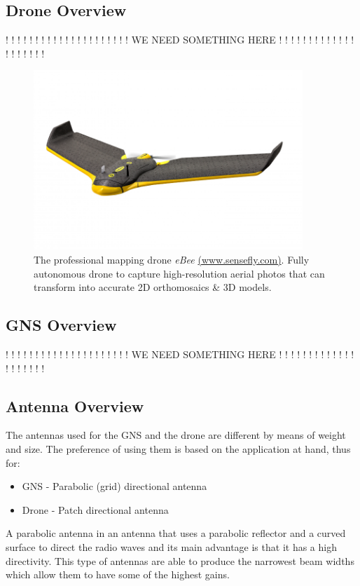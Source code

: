 \subsection{Drone Overview}
			! !	! ! ! ! ! ! ! ! ! ! ! !
! ! ! ! ! ! ! WE NEED SOMETHING HERE ! ! ! ! ! !
			! ! ! ! ! ! ! ! ! ! ! ! ! !

\begin{figure}[hb]
  \centering
  \includegraphics[width=4in]{figures/eBee.png}
  \caption[The professional mapping drone eBee]
   {The professional mapping drone \textit{eBee} \href{https://www.sensefly.com/drones/ebee.html}{(www.sensefly.com)}. Fully autonomous drone to capture high-resolution aerial photos that can transform into accurate 2D orthomosaics \& 3D models.}
\end{figure}

\subsection{GNS Overview}
			! !	! ! ! ! ! ! ! ! ! ! ! !
! ! ! ! ! ! ! WE NEED SOMETHING HERE ! ! ! ! ! !
			! ! ! ! ! ! ! ! ! ! ! ! ! !

\subsection{Antenna Overview}
The antennas used for the GNS and the drone are different by means of weight and size. The preference of using them is based on the application at hand, thus for:
\begin{itemize}
	\item GNS - Parabolic (grid) directional antenna 
	\item Drone - Patch directional antenna
\end{itemize}

A parabolic antenna in an antenna that uses a parabolic reflector and a curved surface to direct the radio waves and its main advantage is that it has a high directivity. This type of antennas are able to produce the narrowest beam widths which allow them to have some of the highest gains.


